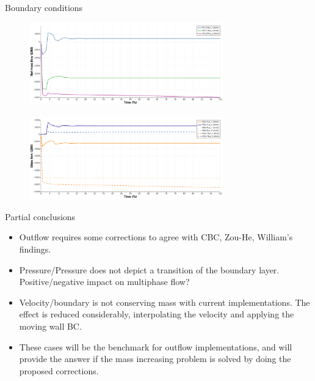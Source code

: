 \documentclass[8pt]{beamer}
\begin{document}
	\begin{frame}{Boundary conditions}
		\begin{figure}
			\centering
			\includegraphics[width=0.75\textwidth]{pics/channelBCComparisionNetFlow.png}
		\end{figure}
		\begin{figure}
			\centering
			\includegraphics[width=0.75\textwidth]{pics/channelBCComparisionBndFlow.png}
		\end{figure}
			
	\end{frame}

	\begin{frame}{Partial conclusions}
		\begin{itemize}
			\item Outflow requires some corrections to agree with CBC, Zou-He, William's findings.
			
			\item Pressure/Pressure does not depict a transition of the boundary layer. Positive/negative impact on multiphase flow?
			
			\item Velocity/boundary is not conserving mass with current implementations. The effect is reduced considerably, interpolating the velocity and applying the moving wall BC.
			
			\item These cases will be the benchmark for outflow implementations, and will provide the answer if the mass increasing problem is solved by doing the proposed corrections.  
		\end{itemize}
	\end{frame}
	
\end{document}
